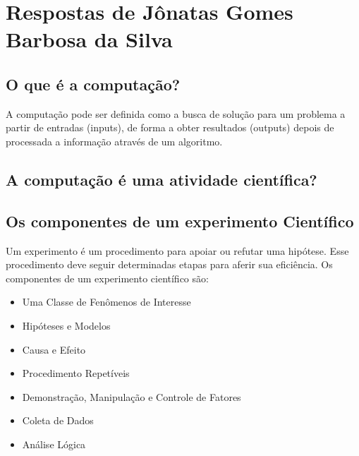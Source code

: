 \section{Respostas de Jônatas Gomes Barbosa da Silva}

\subsection{O que é a computação?}
A computação pode ser definida como a busca de solução para um problema a partir de entradas (inputs), de forma a obter resultados (outputs) depois de processada a informação através de um algoritmo. \citet{wikipedia_computacao_2022}

\subsection{A computação é uma atividade científica?}


\subsection{Os componentes de um experimento Científico}
Um \gls{experimento} é um procedimento para apoiar ou refutar uma hipótese. Esse procedimento deve seguir determinadas etapas para aferir sua eficiência. Os componentes de um experimento científico são:
\begin{itemize}
    \item Uma Classe de Fenômenos de Interesse
    \item Hipóteses e Modelos
    \item Causa e Efeito
    \item Procedimento Repetíveis
    \item Demonstração, Manipulação e Controle de Fatores
    \item Coleta de Dados
    \item Análise Lógica
\end{itemize}
